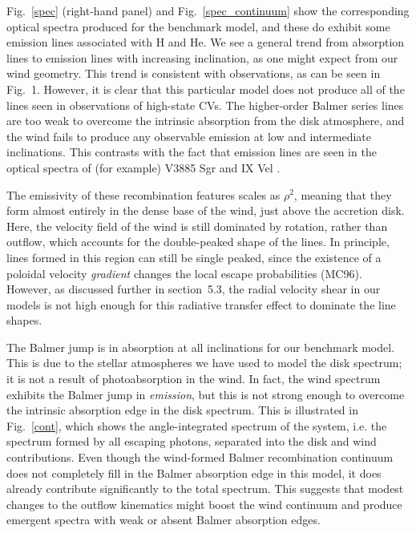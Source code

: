 \documentclass[preprint, a4paper, 11pt]{aastex}
\begin{document}
Fig.~\ref{spec} (right-hand panel) and Fig.~\ref{spec_continuum}
show the corresponding optical spectra produced for
the benchmark model, and these do exhibit some emission lines
associated with H and He. We see a general trend from absorption lines to emission lines 
with increasing inclination, as one might expect from our wind
geometry. This trend is consistent with observations, as can be seen
in Fig.~1. However, it is clear that this particular model
does not produce all of the lines seen in observations of high-state CVs.
The higher-order Balmer series lines are too weak
to overcome the intrinsic absorption from the disk atmosphere, and the wind 
fails to produce any observable emission at low and intermediate inclinations.
This contrasts with the fact that emission lines are seen 
in the optical spectra of (for example) V3885 Sgr \citep{hartley2005}
and IX Vel \citep[][see also Fig.~1]{beuermann1990}.

The emissivity of these recombination 
features scales as $\rho^2$, meaning that they form almost entirely in the 
dense base of the wind, just above the accretion disk. Here, the
velocity field of the wind is still dominated by rotation, rather than
outflow, which accounts for the double-peaked shape of the lines. In
principle, lines formed in this region can still be single peaked,
since the existence of a poloidal velocity {\em gradient} changes the
local escape probabilities (MC96). However, as
discussed further in section~5.3, the 
radial velocity shear in our
models is not high enough for this radiative transfer effect
to dominate the line shapes.

The Balmer jump is in absorption at all inclinations for our benchmark
model. This is due to the stellar atmospheres we have used to
model the disk spectrum; it is not a result of photoabsorption in the
wind. In fact, the wind spectrum exhibits the Balmer jump in {\em
emission}, but this is not strong enough to overcome the intrinsic
absorption edge in the disk spectrum. This is illustrated in
Fig.~\ref{cont}, which shows the angle-integrated spectrum of the system,
i.e. the spectrum formed by all escaping photons, separated into the
disk and wind contributions. Even though the wind-formed Balmer
recombination continuum does not completely fill in the Balmer
absorption edge in this model, it does already contribute
significantly to the total spectrum. This suggests that modest changes 
to the outflow kinematics might boost the wind continuum and produce
emergent spectra with weak or absent Balmer absorption edges. 
\end{document}
